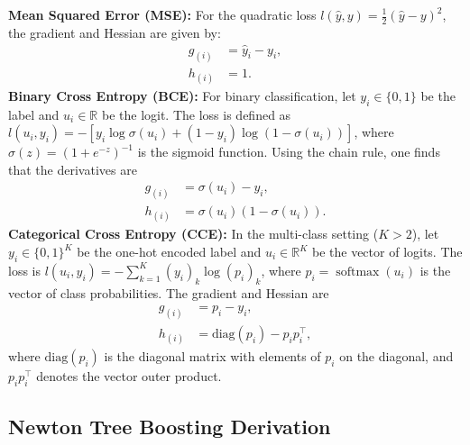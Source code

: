 \documentclass{article}
\theoremstyle{plain}
\theoremstyle{definition}
\theoremstyle{remark}
\begin{document}
\textbf{Mean Squared Error (MSE):}
For the quadratic loss $l(\widehat{y}, y) = \frac{1}{2}(\widehat{y}-y)^2$, the gradient and Hessian are given by:
\begin{align*}
    g_{(i)} &= \widehat{y}_i - y_i, \\
    h_{(i)} &= 1.
\end{align*}
\textbf{Binary Cross Entropy (BCE):}
For binary classification, let $y_i \in \{0,1\}$ be the label and $u_i \in \mathbb{R}$ be the logit. The loss is defined as $l(u_i, y_i) = -[y_i \log \sigma(u_i) + (1-y_i) \log(1-\sigma(u_i))]$, where $\sigma(z) = (1+e^{-z})^{-1}$ is the sigmoid function. Using the chain rule, one finds that the derivatives are
\begin{align*}
    g_{(i)} &= \sigma(u_i) - y_i, \\
    h_{(i)} &= \sigma(u_i)(1-\sigma(u_i)).
\end{align*}
\textbf{Categorical Cross Entropy (CCE):}
In the multi-class setting ($K > 2$), let $y_i \in \{0,1\}^K$ be the one-hot encoded label and $u_i \in \mathbb{R}^K$ be the vector of logits. The loss is $l(u_i, y_i) = -\sum_{k=1}^K (y_i)_k \log (p_i)_k$, where $p_i = \operatorname{softmax}(u_i)$ is the vector of class probabilities. The gradient and Hessian are
\begin{align*}
    g_{(i)} &= p_i - y_i, \\
    h_{(i)} &= \text{diag}(p_i) - p_i p_i^\top,
\end{align*}
where $\text{diag}(p_i)$ is the diagonal matrix with elements of $p_i$ on the diagonal, and $p_i p_i^\top$ denotes the vector outer product.




\subsection{Newton Tree Boosting Derivation}\label{appendixXGBFormulaDerivation}
\end{document}
